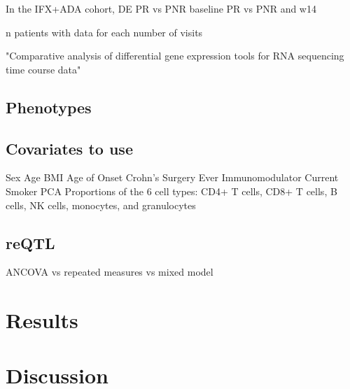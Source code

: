 In the IFX+ADA cohort, 
    DE
    PR vs PNR baseline
    PR vs PNR and w14

n patients with data for each number of visits

"Comparative analysis of differential gene expression tools for RNA sequencing time course data"

\subsection{Phenotypes}

%

\subsection{Covariates to use}

Sex
Age
BMI
Age of Onset
Crohn’s Surgery
Ever Immunomodulator
Current Smoker
PCA
Proportions of the 6 cell types: CD4+ T cells, CD8+ T cells, B cells, NK cells, monocytes, and granulocytes

\subsection{reQTL}



ANCOVA vs repeated measures vs mixed model


\section{Results}

\section{Discussion}

